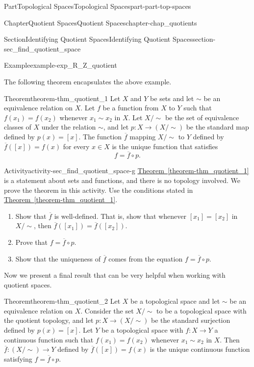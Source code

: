 \documentclass[oneside,10pt,]{book}
\newcommand{\xreffont}{\relax}
\numberwithin{equation}{chapter}
\newcommand{\ssim}{\sim}
\begin{document}
\begin{partptx}{Part}{Topological Spaces}{}{Topological Spaces}{}{}{part-part-top-spaces}
\begin{chapterptx}{Chapter}{Quotient Spaces}{}{Quotient Spaces}{}{}{chapter-chap_quotients}
\begin{sectionptx}{Section}{Identifying Quotient Spaces}{}{Identifying Quotient Spaces}{}{}{section-sec_find_quotient_space}
\begin{example}{Example}{}{example-exp_R_Z_quotient}
\end{example}
The following theorem encapsulates the above example.%
\begin{theorem}{Theorem}{}{}{theorem-thm_quotient_1}%
Let \(X\) and \(Y\) be sets and let \(\sim\) be an equivalence relation on \(X\). Let \(f\) be a function from \(X\) to \(Y\) such that \(f(x_1) = f(x_2)\) whenever \(x_1 \sim x_2\) in \(X\). Let \(X/\ssim\) be the set of equivalence classes of \(X\) under the relation \(\sim\), and let \(p: X \to (X/\ssim)\) be the standard map defined by \(p(x) = [x]\). The function \(\overline{f}\) mapping \(X/\ssim\) to \(Y\) defined by \(\overline{f}([x]) = f(x)\) for every \(x \in X\) is the unique function that satisfies%
\begin{equation*}
f = \overline{f} \circ p\text{.}
\end{equation*}
%
\end{theorem}
\begin{activity}{Activity}{}{activity-sec_find_quotient_space-g}%
\hyperref[theorem-thm_quotient_1]{Theorem~{\xreffont\ref{theorem-thm_quotient_1}}} is a statement about sets and functions, and there is no topology involved. We prove the theorem in this activity. Use the conditions stated in \hyperref[theorem-thm_quotient_1]{Theorem~{\xreffont\ref{theorem-thm_quotient_1}}}.%
\begin{enumerate}[font=\bfseries,label=(\alph*),ref=\alph*]%
\item{}Show that \(\overline{f}\) is well-defined. That is, show that whenever \([x_1] = [x_2]\) in \(X/\ssim\), then \(\overline{f}([x_1]) =\overline{f}([x_2])\).%
\item{}Prove that \(f = \overline{f} \circ p\).%
\item{}Show that the uniqueness of \(\overline{f}\) comes from the equation \(f = \overline{f} \circ p\).%
\end{enumerate}%
\end{activity}%
Now we present a final result that can be very helpful when working with quotient spaces.%
\begin{theorem}{Theorem}{}{}{theorem-thm_quotient_2}%
Let \(X\) be a topological space and let \(\sim\) be an equivalence relation on \(X\). Consider the set \(X/\ssim\) to be a topological space with the quotient topology, and let \(p: X \to (X/\ssim)\) be the standard surjection defined by \(p(x) = [x]\). Let \(Y\) be a topological space with \(f: X \to Y\) a continuous function such that \(f(x_1) = f(x_2)\) whenever \(x_1 \sim x_2\) in \(X\). Then \(\overline{f} : (X/\ssim) \to Y\) defined by \(\overline{f}([x]) = f(x)\) is the unique continuous function satisfying \(f = \overline{f} \circ p\).%

\end{theorem}
\end{sectionptx}
\end{chapterptx}
\end{partptx}
\end{document}
